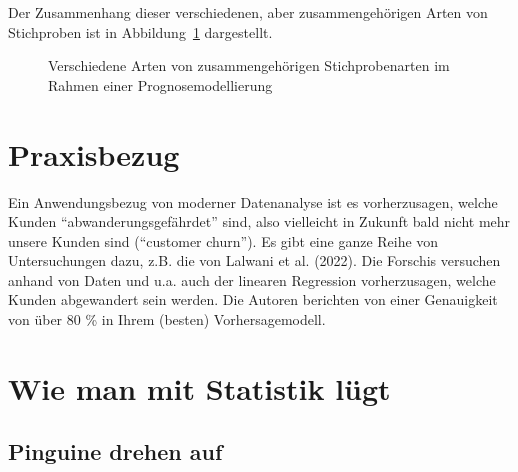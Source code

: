 \documentclass[
  letterpaper,
  oneside,
  open=any]{scrbook}
\theoremstyle{definition}
\theoremstyle{definition}
\theoremstyle{definition}
\theoremstyle{remark}
\begin{document}
Der Zusammenhang dieser verschiedenen, aber zusammengehörigen Arten von
Stichproben ist in Abbildung~\ref{fig-sample-types} dargestellt.

\begin{figure}


\caption{\label{fig-sample-types}Verschiedene Arten von
zusammengehörigen Stichprobenarten im Rahmen einer Prognosemodellierung}

\end{figure}%

\section{Praxisbezug}\label{praxisbezug-4}

Ein Anwendungsbezug von moderner Datenanalyse ist es vorherzusagen,
welche Kunden \enquote{abwanderungsgefährdet} sind, also vielleicht in
Zukunft bald nicht mehr unsere Kunden sind (\enquote{customer churn}).
Es gibt eine ganze Reihe von Untersuchungen dazu, z.B. die von Lalwani
et al. (2022). Die Forschis versuchen anhand von Daten und u.a. auch der
linearen Regression vorherzusagen, welche Kunden abgewandert sein
werden. Die Autoren berichten von einer Genauigkeit von über 80 \% in
Ihrem (besten) Vorhersagemodell.

\section{Wie man mit Statistik
lügt}\label{wie-man-mit-statistik-luxfcgt-5}

\subsection{Pinguine drehen auf}\label{pinguine-drehen-auf}
\end{document}
